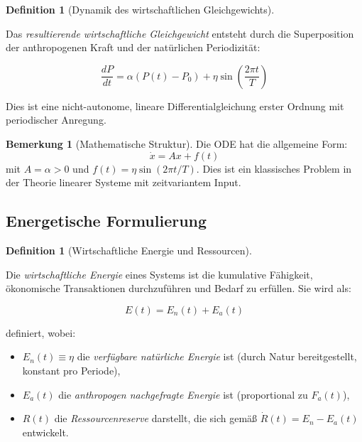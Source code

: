 \documentclass[a4paper, 12pt, twoside, openright]{report}
\theoremstyle{definition}
\newtheorem{definition}[theorem]{Definition}
\theoremstyle{definition}
\newtheorem{bemerkung}{Bemerkung}[chapter]
\begin{document}
\begin{definition}[Dynamik des wirtschaftlichen Gleichgewichts]\label{def:gleichgewicht}
    
    Das \emph{resultierende wirtschaftliche Gleichgewicht} entsteht durch die Superposition der anthropogenen Kraft und der natürlichen Periodizität:
    
    \begin{equation}
        \boxed{\frac{dP}{dt} = \alpha(P(t) - P_0) + \eta \sin\left(\frac{2\pi t}{T}\right)}
        \label{eq:gleichgewicht_ode}
    \end{equation}
    
    Dies ist eine nicht-autonome, lineare Differentialgleichung erster Ordnung mit periodischer Anregung.
\end{definition}

\begin{bemerkung}[Mathematische Struktur]
    
    Die ODE hat die allgemeine Form:
    \begin{equation}
        \dot{x} = Ax + f(t)
    \end{equation}
    mit $A = \alpha > 0$ und $f(t) = \eta \sin(2\pi t / T)$. Dies ist ein klassisches Problem in der Theorie linearer Systeme mit zeitvariantem Input.
\end{bemerkung}

\subsection{Energetische Formulierung}

\begin{definition}[Wirtschaftliche Energie und Ressourcen]\label{def:energie}
    
    Die \emph{wirtschaftliche Energie} eines Systems ist die kumulative Fähigkeit, ökonomische Transaktionen durchzuführen und Bedarf zu erfüllen. Sie wird als:
    
    \begin{equation}
        E(t) = E_n(t) + E_a(t)
    \end{equation}
    
    definiert, wobei:
    \begin{itemize}
        \item $E_n(t) \equiv \eta$ die \emph{verfügbare natürliche Energie} ist (durch Natur bereitgestellt, konstant pro Periode),
        \item $E_a(t)$ die \emph{anthropogen nachgefragte Energie} ist (proportional zu $F_a(t)$),
        \item $R(t)$ die \emph{Ressourcenreserve} darstellt, die sich gemäß $\dot{R}(t) = E_n - E_a(t)$ entwickelt.
    \end{itemize}
\end{definition}
\end{document}
